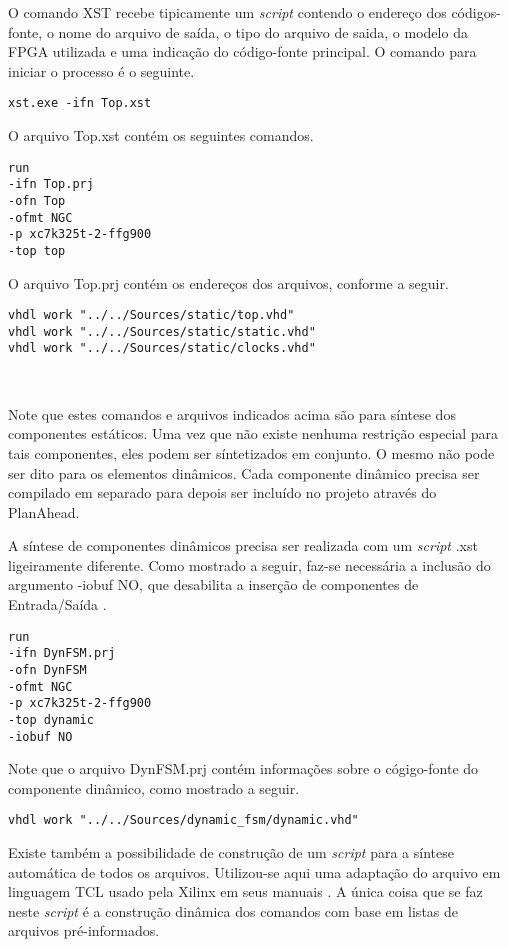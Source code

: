 \documentclass[11pt,a4paper,oneside]{book}
\begin{document}
O comando XST recebe tipicamente um \textit{script} contendo o endereço dos códigos-fonte, o nome do arquivo de saída, o tipo do arquivo de saida, o modelo da FPGA utilizada e uma indicação do código-fonte principal.
O comando para iniciar o processo é o seguinte.
\begin{lstlisting}[style=customVHDL]
xst.exe -ifn Top.xst
\end{lstlisting}
O arquivo \dlq{}Top.xst\drq{} contém os seguintes comandos.
\begin{lstlisting}[style=customVHDL]
run
-ifn Top.prj
-ofn Top
-ofmt NGC
-p xc7k325t-2-ffg900
-top top
\end{lstlisting}
O arquivo \dlq{}Top.prj\drq{} contém os endereços dos arquivos, conforme a seguir.
\begin{lstlisting}[style=customVHDL]
vhdl work "../../Sources/static/top.vhd"
vhdl work "../../Sources/static/static.vhd"
vhdl work "../../Sources/static/clocks.vhd"
\end{lstlisting}\

Note que estes comandos e arquivos indicados acima são para síntese dos componentes estáticos.
Uma vez que não existe nenhuma restrição especial para tais componentes, eles podem ser síntetizados em conjunto.
O mesmo não pode ser dito para os elementos dinâmicos.
Cada componente dinâmico precisa ser compilado em separado para depois ser incluído no projeto através do PlanAhead.

A síntese de componentes dinâmicos precisa ser realizada com um \textit{script} \dlq{}.xst\drq{} ligeiramente diferente.
Como mostrado a seguir, faz-se necessária a inclusão do argumento \dlq{}-iobuf NO\drq{}, que desabilita a inserção de componentes de Entrada/Saída \cite{ug743, ug748}.
\begin{lstlisting}[style=customVHDL]
run
-ifn DynFSM.prj
-ofn DynFSM
-ofmt NGC
-p xc7k325t-2-ffg900
-top dynamic
-iobuf NO
\end{lstlisting}
Note que o arquivo \dlq{}DynFSM.prj\drq{} contém informações sobre o cógigo-fonte do componente dinâmico, como mostrado a seguir.
\begin{lstlisting}[style=customVHDL]
vhdl work "../../Sources/dynamic_fsm/dynamic.vhd"
\end{lstlisting}

Existe também a possibilidade de construção de um \textit{script} para a síntese automática de todos os arquivos.
Utilizou-se aqui uma adaptação do arquivo em linguagem TCL usado pela Xilinx em seus manuais \cite{ug702, ug743, ug744}.
A única coisa que se faz neste \textit{script} é a construção dinâmica dos comandos com base em listas de arquivos pré-informados.
\end{document}
